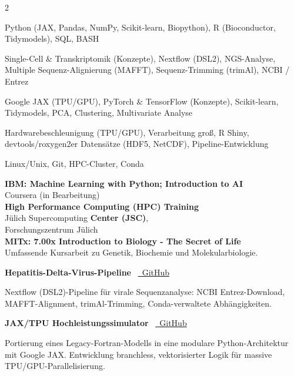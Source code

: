 \documentclass{thejus_cv}
\begin{document}
\begin{paracol}{2}

         {Python (JAX, Pandas, NumPy, Scikit-learn, Biopython), R (Bioconductor, Tidymodels), SQL, BASH}

         {Single-Cell \& Transkriptomik (Konzepte), Nextflow (DSL2), NGS-Analyse, Multiple Sequenz-Alignierung (MAFFT), Sequenz-Trimming (trimAl), NCBI / Entrez}

         {Google JAX (TPU/GPU), PyTorch \& TensorFlow (Konzepte), Scikit-learn, Tidymodels, PCA, Clustering, Multivariate Analyse}

         {Hardwarebeschleunigung (TPU/GPU), Verarbeitung gro{\ss, R Shiny, devtools/roxygen2}er Datens\"atze (HDF5, NetCDF), Pipeline-Entwicklung}

         {Linux/Unix, Git, HPC-Cluster, Conda}



\textbf{IBM: Machine Learning with Python; Introduction to AI}\\
{\small Coursera (in Bearbeitung)}\\[0.3cm]

\textbf{High Performance Computing (HPC) Training}\\
J\"ulich Supercomputing \textbf{Center (JSC)},\\
Forschungszentrum J\"ulich\\[0.3cm]

\textbf{MITx: 7.00x Introduction to Biology - The Secret of Life}\\
{\small Umfassende Kursarbeit zu Genetik, Biochemie und Molekularbiologie.}\\[0.4cm]


\textbf{Hepatitis-Delta-Virus-Pipeline} \textbullet\ \href{https://github.com/thejusmahajan/hepatitis-delta-pipeline}{\faGithub\ GitHub}\par
{\small Nextflow (DSL2)-Pipeline f\"ur virale Sequenzanalyse: NCBI Entrez-Download, MAFFT-Alignment, trimAl-Trimming, Conda-verwaltete Abh\"angigkeiten.}\par
\vspace{0.3em}

\textbf{JAX/TPU Hochleistungssimulator} \textbullet\ \href{https://github.com/thejusmahajan/Agent_Based_Phytoplankton_Model-IBM-Phytoplankton}{\faGithub\ GitHub}\par
{\small Portierung eines Legacy-Fortran-Modells in eine modulare Python-Architektur mit Google JAX. Entwicklung branchless, vektorisierter Logik f\"ur massive TPU/GPU-Parallelisierung.}\par
\vspace{0.3em}


\end{paracol}
\end{document}
